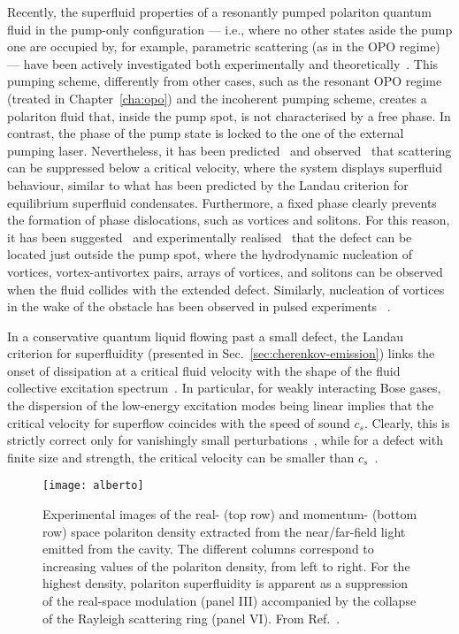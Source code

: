 Recently, the superfluid properties of a resonantly pumped polariton
quantum fluid in the pump-only configuration --- i.e., where no other
states aside the pump one are occupied by, for example, parametric
scattering (as in the OPO regime) --- have been actively investigated
both experimentally and
theoretically~\cite{Carusotto_2004,Ciuti_2005,Amo_2009,Cancellieri_2010,Pigeon_2011,Amo_2011,Nardin_2011,Sanvitto_2011}. This
pumping scheme, differently from other cases, such as the resonant OPO
regime (treated in Chapter~\ref{cha:opo}) and the incoherent pumping
scheme, creates a polariton fluid that, inside the pump spot, is not
characterised by a free phase. In contrast, the phase of the pump
state is locked to the one of the external pumping
laser. Nevertheless, it has been
predicted~\cite{Carusotto_2004,Ciuti_2005} and
observed~\cite{Amo_2009} that scattering can be suppressed below a
critical velocity, where the system displays superfluid behaviour,
similar to what has been predicted by the Landau criterion for
equilibrium superfluid condensates. Furthermore, a fixed phase clearly
prevents the formation of phase dislocations, such as vortices and
solitons. For this reason, it has been suggested~\cite{Pigeon_2011}
and experimentally realised~\cite{Amo_2011} that the defect can be
located just outside the pump spot, where the hydrodynamic nucleation
of vortices, vortex-antivortex pairs, arrays of vortices, and solitons
can be observed when the fluid collides with the extended
defect. Similarly, nucleation of vortices in the wake of the obstacle
has been observed in pulsed experiments
~\cite{Nardin_2011,Sanvitto_2011}.

In a conservative quantum liquid flowing past a small defect, the
Landau criterion for superfluidity (presented in
Sec.~\ref{sec:cherenkov-emission}) links the onset of dissipation at a
critical fluid velocity with the shape of the fluid collective
excitation spectrum~\cite{9780198507192}. In particular, for weakly
interacting Bose gases, the dispersion of the low-energy excitation
modes being linear implies that the critical velocity for superflow
coincides with the speed of sound $c_s$. Clearly, this is strictly
correct only for vanishingly small
perturbations~\cite{Astrakharchik_2004}, while for a defect with
finite size and strength, the critical velocity can be smaller than
$c_s$~\cite{Onofrio_2000,Ianeselli_2006}.
%
\begin{figure}[tb]\centering
  \texttt{[image: alberto]}
  \caption{
    Experimental images of the real- (top row) and momentum- (bottom
    row) space polariton density extracted from the near/far-field light
    emitted from the cavity. The different columns correspond to
    increasing values of the polariton density, from left to right. For
    the highest density, polariton superfluidity is apparent as a
    suppression of the real-space modulation (panel III) accompanied by
    the collapse of the Rayleigh scattering ring (panel VI).
    From Ref.~\cite{Amo_2009}.
  }\label{fig:alberto}
\end{figure}
% 

